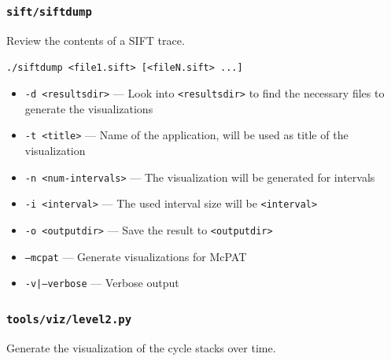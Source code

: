 \documentclass[a4paper,11pt,titlepage]{article}
\newcommand{\cmd}[1]{{\tt #1}}
\newcommand{\opt}[1]{{\tt #1}}
\begin{document}
\subsubsection{\cmd{sift/siftdump}}

Review the contents of a SIFT trace.

\cmd{./siftdump <file1.sift> [<fileN.sift> ...]}

\begin{itemize}[label=$$]
\item \opt{<file>} --- One or more SIFT trace files to view
\end{itemize}

\subsection{Visualization}

\subsubsection{\cmd{tools/viz.py}}
Generate the visualizations.

\cmd{tools/viz.py [-h|--help (help)] [-d <resultsdir (default: .)>] [-t <title>] [-n <num-intervals (default: all$\_$intervals)>] [-i <interval (default: smallest$\_$interval)>] [-o <outputdir>] [--mcpat] [-v|--verbose]}

\begin{itemize}[label=$$]
\item \opt{-d <resultsdir>} --- Look into \opt{<resultsdir>} to find the necessary files to generate the visualizations
\item \opt{-t <title>} --- Name of the application, will be used as title of the visualization
\item \opt{-n <num-intervals>} --- The visualization will be generated for \opt{<num-intervals>} intervals
\item \opt{-i <interval>} --- The used interval size will be \opt{<interval>} 
\item \opt{-o <outputdir>} --- Save the result to \opt{<outputdir>}
\item \opt{--mcpat} --- Generate visualizations for McPAT
\item \opt{-v|--verbose} --- Verbose output
\end{itemize}

\subsubsection{\cmd{tools/viz/level2.py}}
Generate the visualization of the cycle stacks over time.
\end{document}
